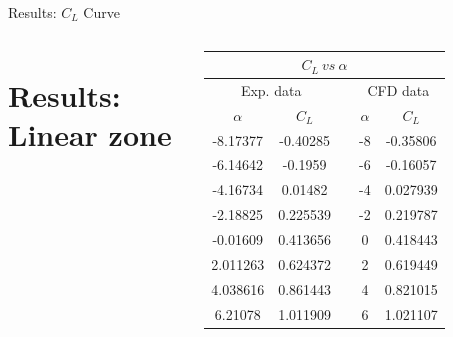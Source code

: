 \documentclass[english,10pt,a4paper,twoside]{beamer}
\begin{document}
	\begin{frame}[shrink = 65]{Results: $C_L$ Curve}
			\begin{columns}[T] 
		\section{Results: Linear zone}
		\begin{table}[H]
			\centering
			\begin{tabular}{|ccccc|}
				\hline
				\multicolumn{5}{|c|}{$C_L~vs~ \alpha$}                                                                                             \\ \hline
				\multicolumn{2}{|c|}{Exp. data}                                & \multicolumn{1}{c|}{} & \multicolumn{2}{c|}{CFD data}            \\ \cline{1-2} \cline{4-5} 
				\multicolumn{1}{|c|}{$\alpha$} & \multicolumn{1}{c|}{$C_L$}    & \multicolumn{1}{c|}{} & \multicolumn{1}{c|}{$\alpha$} & $C_L$    \\ \cline{1-2} \cline{4-5} 
				\multicolumn{1}{|c|}{-8.17377} & \multicolumn{1}{c|}{-0.40285} & \multicolumn{1}{c|}{} & \multicolumn{1}{c|}{-8}       & -0.35806 \\ \cline{1-2} \cline{4-5} 
				\multicolumn{1}{|c|}{-6.14642} & \multicolumn{1}{c|}{-0.1959}  & \multicolumn{1}{c|}{} & \multicolumn{1}{c|}{-6}       & -0.16057 \\ \cline{1-2} \cline{4-5} 
				\multicolumn{1}{|c|}{-4.16734} & \multicolumn{1}{c|}{0.01482}  & \multicolumn{1}{c|}{} & \multicolumn{1}{c|}{-4}       & 0.027939 \\ \cline{1-2} \cline{4-5} 
				\multicolumn{1}{|c|}{-2.18825} & \multicolumn{1}{c|}{0.225539} & \multicolumn{1}{c|}{} & \multicolumn{1}{c|}{-2}       & 0.219787 \\ \cline{1-2} \cline{4-5} 
				\multicolumn{1}{|c|}{-0.01609} & \multicolumn{1}{c|}{0.413656} & \multicolumn{1}{c|}{} & \multicolumn{1}{c|}{0}        & 0.418443 \\ \cline{1-2} \cline{4-5} 
				\multicolumn{1}{|c|}{2.011263} & \multicolumn{1}{c|}{0.624372} & \multicolumn{1}{c|}{} & \multicolumn{1}{c|}{2}        & 0.619449 \\ \cline{1-2} \cline{4-5} 
				\multicolumn{1}{|c|}{4.038616} & \multicolumn{1}{c|}{0.861443} & \multicolumn{1}{c|}{} & \multicolumn{1}{c|}{4}        & 0.821015 \\ \cline{1-2} \cline{4-5} 
				\multicolumn{1}{|c|}{6.21078}  & \multicolumn{1}{c|}{1.011909} & \multicolumn{1}{c|}{} & \multicolumn{1}{c|}{6}        & 1.021107 \\ \cline{1-2} \cline{4-5} 

\end{tabular}
\end{table}
\end{columns}
\end{frame}
\end{document}
